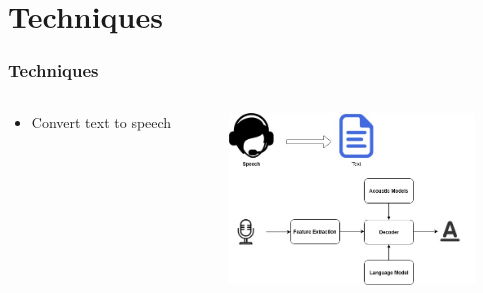 \documentclass{beamer}
\begin{document}
\section{Techniques } %


\begin{frame}
	\frametitle{Techniques}
	
	\begin{columns}[T]
		\begin{column}{.5\textwidth}
			\begin{itemize}
				\item Convert text to speech
			\end{itemize}
		\end{column}
		\begin{column}{.5\textwidth}
			
			\includegraphics[width=65mm]{f1.jpg}
			
		\end{column}
	\end{columns}

\end{frame}

\end{document}
